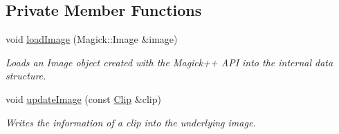 \subsection*{Private Member Functions}
\begin{CompactItemize}
\item 
void \hyperlink{class_recognizer_acc4244738f2577a0c344c3b3af22eb0}{loadImage} (Magick::Image \&image)
\begin{CompactList}\small\item\em Loads an Image object created with the Magick++ API into the internal data structure. \item\end{CompactList}\item 
void \hyperlink{class_recognizer_0779d8bb035f7d51cb26fdc3d410e019}{updateImage} (const \hyperlink{class_clip}{Clip} \&clip)
\begin{CompactList}\small\item\em Writes the information of a clip into the underlying image. \item\end{CompactList}\end{CompactItemize}
